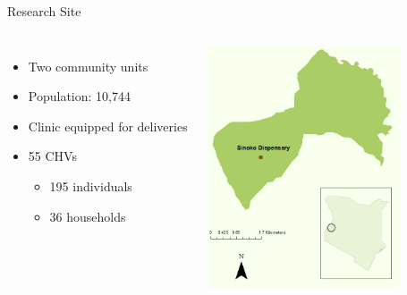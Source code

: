 \documentclass[xcolor=x11names, handout, compress]{beamer}
\renewcommand{\(}{\begin{columns}}
\renewcommand{\)}{\end{columns}}
\newcommand{\<}[1]{\begin{column}{#1}}
\renewcommand{\>}{\end{column}}
\begin{document}
\begin{frame}{Research Site}
\begin{columns}[c]
	\column{2in}
	\begin{itemize}
			\item{Two community units}
			\item{Population: 10,744}
			\item{Clinic equipped for deliveries}
			\item{55 CHVs}
				\begin{itemize}
					\item{195 individuals}
					\item{36 households}
				\end{itemize}
	\end{itemize}
	\column{2.5in}
	\includegraphics[width=2.25in]{map_portrait}

\end{columns}
\end{frame}
\end{document}
